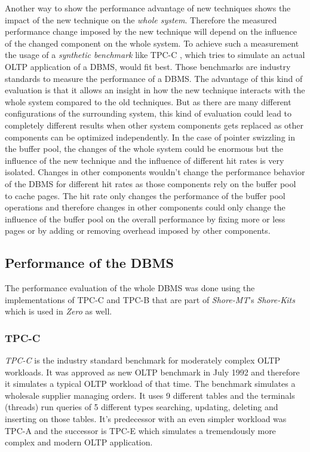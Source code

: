     Another way to show the performance advantage of new techniques shows the impact of the new technique on the \emph{whole system}. Therefore the measured performance change imposed by the new technique will depend on the influence of the changed component on the whole system. To achieve such a measurement the usage of a \emph{synthetic benchmark} like TPC-C \cite{TPC-C}, which tries to simulate an actual OLTP application of a DBMS, would fit best. Those benchmarks are industry standards to measure the performance of a DBMS. The advantage of this kind of evaluation is that it allows an insight in how the new technique interacts with the whole system compared to the old techniques. But as there are many different configurations of the surrounding system, this kind of evaluation could lead to completely different results when other system components gets replaced as other components can be optimized independently. In the case of pointer swizzling in the buffer pool, the changes of the whole system could be enormous but the influence of the new technique and the influence of different hit rates is very isolated. Changes in other components wouldn't change the performance behavior of the DBMS for different hit rates as those components rely on the buffer pool to cache pages. The hit rate only changes the performance of the buffer pool operations and therefore changes in other components could only change the influence of the buffer pool on the overall performance by fixing more or less pages or by adding or removing overhead imposed by other components.

\subsection{Performance of the DBMS}

    The performance evaluation of the whole DBMS was done using the implementations of TPC-C and TPC-B that are part of \emph{Shore-MT}'s \emph{Shore-Kits} which is used in \emph{Zero} as well.

\subsubsection{TPC-C} \label{subsub:tpcc}

    \emph{TPC-C} \cite{TPC-C} is the industry standard benchmark for moderately complex OLTP workloads. It was approved as new OLTP benchmark in July 1992 and therefore it simulates a typical OLTP workload of that time. The benchmark simulates a wholesale supplier managing orders. It uses 9 different tables and the terminals (threads) run queries of 5 different types searching, updating, deleting and inserting on those tables. It's predecessor with an even simpler workload was TPC-A and the successor is TPC-E which simulates a tremendously more complex and modern OLTP application.


